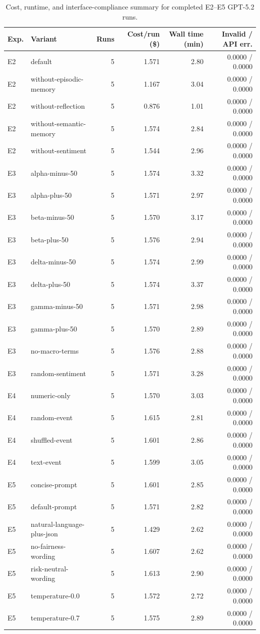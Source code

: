 \ifdefined\FinEvoAllowHistoricalPrePZeroEvidence\else
{}
\fi
\begin{table}[t]
\centering
\scriptsize
\setlength{\tabcolsep}{3pt}
\begin{tabular}{llrrrr}
\toprule
Exp. & Variant & Runs & Cost/run (\$) & Wall time (min) & Invalid / API err. \\
\midrule
E2 & default & 5 & 1.571 & 2.80 & 0.0000 / 0.0000 \\
E2 & without-episodic-memory & 5 & 1.167 & 3.04 & 0.0000 / 0.0000 \\
E2 & without-reflection & 5 & 0.876 & 1.01 & 0.0000 / 0.0000 \\
E2 & without-semantic-memory & 5 & 1.574 & 2.84 & 0.0000 / 0.0000 \\
E2 & without-sentiment & 5 & 1.544 & 2.96 & 0.0000 / 0.0000 \\
E3 & alpha-minus-50 & 5 & 1.574 & 3.32 & 0.0000 / 0.0000 \\
E3 & alpha-plus-50 & 5 & 1.571 & 2.97 & 0.0000 / 0.0000 \\
E3 & beta-minus-50 & 5 & 1.570 & 3.17 & 0.0000 / 0.0000 \\
E3 & beta-plus-50 & 5 & 1.576 & 2.94 & 0.0000 / 0.0000 \\
E3 & delta-minus-50 & 5 & 1.574 & 2.99 & 0.0000 / 0.0000 \\
E3 & delta-plus-50 & 5 & 1.574 & 3.37 & 0.0000 / 0.0000 \\
E3 & gamma-minus-50 & 5 & 1.571 & 2.98 & 0.0000 / 0.0000 \\
E3 & gamma-plus-50 & 5 & 1.570 & 2.89 & 0.0000 / 0.0000 \\
E3 & no-macro-terms & 5 & 1.576 & 2.88 & 0.0000 / 0.0000 \\
E3 & random-sentiment & 5 & 1.571 & 3.28 & 0.0000 / 0.0000 \\
E4 & numeric-only & 5 & 1.570 & 3.03 & 0.0000 / 0.0000 \\
E4 & random-event & 5 & 1.615 & 2.81 & 0.0000 / 0.0000 \\
E4 & shuffled-event & 5 & 1.601 & 2.86 & 0.0000 / 0.0000 \\
E4 & text-event & 5 & 1.599 & 3.05 & 0.0000 / 0.0000 \\
E5 & concise-prompt & 5 & 1.601 & 2.85 & 0.0000 / 0.0000 \\
E5 & default-prompt & 5 & 1.571 & 2.82 & 0.0000 / 0.0000 \\
E5 & natural-language-plus-json & 5 & 1.429 & 2.62 & 0.0000 / 0.0000 \\
E5 & no-fairness-wording & 5 & 1.607 & 2.62 & 0.0000 / 0.0000 \\
E5 & risk-neutral-wording & 5 & 1.613 & 2.90 & 0.0000 / 0.0000 \\
E5 & temperature-0.0 & 5 & 1.572 & 2.72 & 0.0000 / 0.0000 \\
E5 & temperature-0.7 & 5 & 1.575 & 2.89 & 0.0000 / 0.0000 \\
\bottomrule
\end{tabular}
\caption{Cost, runtime, and interface-compliance summary for completed E2--E5 GPT-5.2 runs.}
\label{tab:appendix_cost_error}
\end{table}
